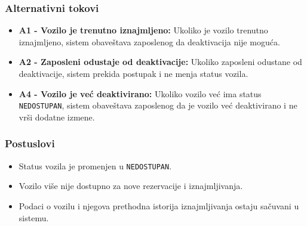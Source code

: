 \subsubsection{Alternativni tokovi}

\begin{itemize}
    \item \textbf{A1 - Vozilo je trenutno iznajmljeno:}
    Ukoliko je vozilo trenutno iznajmljeno, sistem obaveštava zaposlenog da deaktivacija nije moguća.

    \item \textbf{A2 - Zaposleni odustaje od deaktivacije:}
    Ukoliko zaposleni odustane od deaktivacije, sistem prekida postupak i ne menja status vozila.

    \item \textbf{A4 - Vozilo je već deaktivirano:}
    Ukoliko vozilo već ima status \texttt{NEDOSTUPAN}, sistem obaveštava zaposlenog da je vozilo već deaktivirano i ne vrši dodatne izmene.
\end{itemize}

\subsubsection{Postuslovi}

\begin{itemize}
    \item Status vozila je promenjen u \texttt{NEDOSTUPAN}.
    \item Vozilo više nije dostupno za nove rezervacije i iznajmljivanja.
    \item Podaci o vozilu i njegova prethodna istorija iznajmljivanja ostaju sačuvani u sistemu.
\end{itemize}
